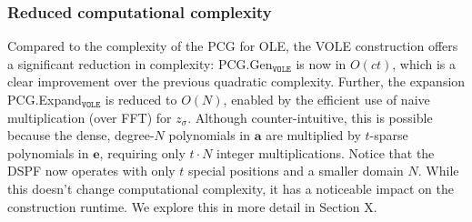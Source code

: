 \subsubsection{Reduced computational complexity}
Compared to the complexity of the PCG for OLE, the VOLE construction offers a significant reduction in complexity: PCG.Gen$_{\texttt{VOLE}}$ is now in $O(ct)$, which is a clear improvement over the previous quadratic complexity. Further, the expansion PCG.Expand$_{\texttt{VOLE}}$ is reduced to $O(N)$, enabled by the efficient use of naive multiplication (over FFT) for $z_\sigma$. Although counter-intuitive, this is possible because the dense, degree-$N$ polynomials in $\boldsymbol{a}$ are multiplied by $t$-sparse polynomials in $\boldsymbol{e}$, requiring only $t \cdot N$ integer multiplications. Notice that the DSPF now operates with only $t$ special positions and a smaller domain $N$. While this doesn't change computational complexity, it has a noticeable impact on the construction runtime. We explore this in more detail in Section X.